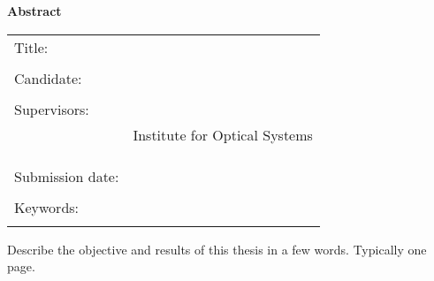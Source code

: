 \thispagestyle{plain}
\vspace*{11pt}
\begin{center}
	{\LARGE \textbf{\textsf{Abstract}}}
\end{center}

\bigskip

\begin{center}
	\begin{tabular}{p{3.2cm}p{9.6cm}}
		Title: & \thema \\
		 & \\
		Candidate: & \autor \\
		 & \\
		Supervisors: & \prueferA \\[.5ex]
		 & Institute for Optical Systems\\[3ex]
		 & \prueferB \\[.5ex]
		 & \firma \\
		 & \\
		Submission date: & \abgabedatum \\
		 & \\
		Keywords: & \schlagworte \\
		 & \\
	\end{tabular}
\end{center}

\bigskip

\noindent

Describe the objective and results of this thesis in a few words.
Typically one page.